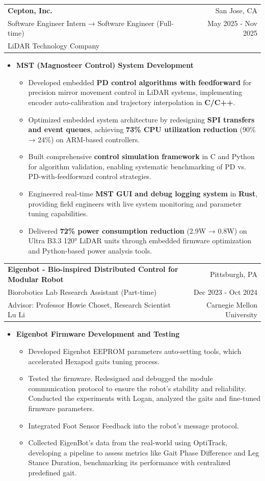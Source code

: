 \documentclass[a4paper]{article}
\makeatletter
\newcommand{\resumeExperienceSubheading}[6]{
  \vspace{5pt}\item
    \begin{tabular*}{0.98\textwidth}{@{\hspace{-0.5em}}l@{\extracolsep{\fill}}r@{}}
      \textbf{#1} & {#2} \\
      {#3} & {#4} \\
      {#5} & {#6}
    \end{tabular*}
  \vspace{-6pt}
}
\newcommand{\resumeExperienceItemListStart}{\begin{itemize}[leftmargin=*]}
\newcommand{\resumeExperienceItemListEnd}{\end{itemize}\vspace{-5pt}}
\newcommand{\resumeExperienceItem}[1]{\item{{#1 \vspace{-1pt}}}}
\newcommand{\resumeExperienceSubItemListStart}{\begin{itemize}[leftmargin=*]}
\newcommand{\resumeExperienceSubItemListEnd}{\end{itemize}\vspace{-5pt}}
\newcommand{\resumeExperienceSubItem}[2]{
  \item{
    \textbf{#1}
    {#2 \vspace{-2pt}}
  }
}
\makeatother
\begin{document}
\resumeExperienceSubheading
{Cepton, Inc.} {San Jose, CA}
{Software Engineer Intern → Software Engineer (Full-time)} {May 2025 - Nov 2025}
{LiDAR Technology Company} {}
\resumeExperienceSubItemListStart
\resumeExperienceSubItem{MST (Magnosteer Control) System Development}{
  \resumeExperienceItemListStart
  \resumeExperienceItem{Developed embedded \textbf{PD control algorithms with feedforward} for precision mirror movement control in LiDAR systems, implementing encoder auto-calibration and trajectory interpolation in \textbf{C/C++}.}
  \resumeExperienceItem{Optimized embedded system architecture by redesigning \textbf{SPI transfers and event queues}, achieving \textbf{73\% CPU utilization reduction} (90\% → 24\%) on ARM-based controllers.}
  \resumeExperienceItem{Built comprehensive \textbf{control simulation framework} in C and Python for algorithm validation, enabling systematic benchmarking of PD vs. PD-with-feedforward control strategies.}
  \resumeExperienceItem{Engineered real-time \textbf{MST GUI and debug logging system} in \textbf{Rust}, providing field engineers with live system monitoring and parameter tuning capabilities.}
  \resumeExperienceItem{Delivered \textbf{72\% power consumption reduction} (2.9W → 0.8W) on Ultra B3.3 120° LiDAR units through embedded firmware optimization and Python-based power analysis tools.}
  \resumeExperienceItemListEnd
}
\resumeExperienceSubItemListEnd


\resumeExperienceSubheading
{Eigenbot - Bio-inspired Distributed Control for Modular Robot} {Pittsburgh, PA}
{Biorobotics Lab Research Assistant (Part-time)} {Dec 2023 - Oct 2024}
{Advisor: Professor Howie Choset, Research Scientist Lu Li} {Carnegie Mellon University}
\resumeExperienceSubItemListStart
\resumeExperienceSubItem{Eigenbot Firmware Development and Testing}{
  \resumeExperienceItemListStart
  \resumeExperienceItem{Developed Eigenbot EEPROM parameters auto-setting tools, which accelerated Hexapod gaits tuning process.}
  \resumeExperienceItem{Tested the firmware. Redesigned and debugged the module communication protocol to ensure the robot's stability and reliability. Conducted the experiments with Logan, analyzed the gaits and fine-tuned firmware parameters.}
  \resumeExperienceItem{Integrated Foot Sensor Feedback into the robot's message protocol.}
  \resumeExperienceItem{Collected EigenBot's data from the real-world using OptiTrack, developing a pipeline to assess metrics like Gait Phase Difference and Leg Stance Duration, benchmarking its performance with centralized predefined gait.}
  \resumeExperienceItemListEnd
}
\resumeExperienceSubItemListEnd
\end{document}

